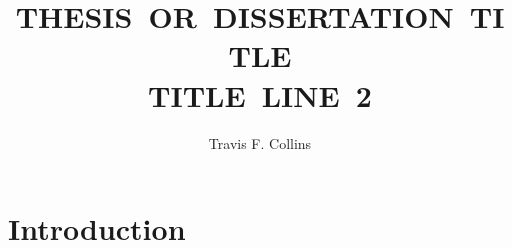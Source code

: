 \documentclass[16pt, draft]{mvlthesis}
\title{\scshape \mbox{THESIS OR DISSERTATION TITLE}\\
\scshape \mbox{TITLE LINE 2}}
\author{Travis F. Collins}
\begin{document}
\maketitle
\begin{abstract}



\end{abstract}


\begin{frontmatter}

\begin{acknowledgements}
\end{acknowledgements}
\tableofcontents
\listoffigures
\listoftables

\end{frontmatter}



\chapter{Introduction}
\label{ch:introduction}

%

%
%

%
%










%


\end{document}
